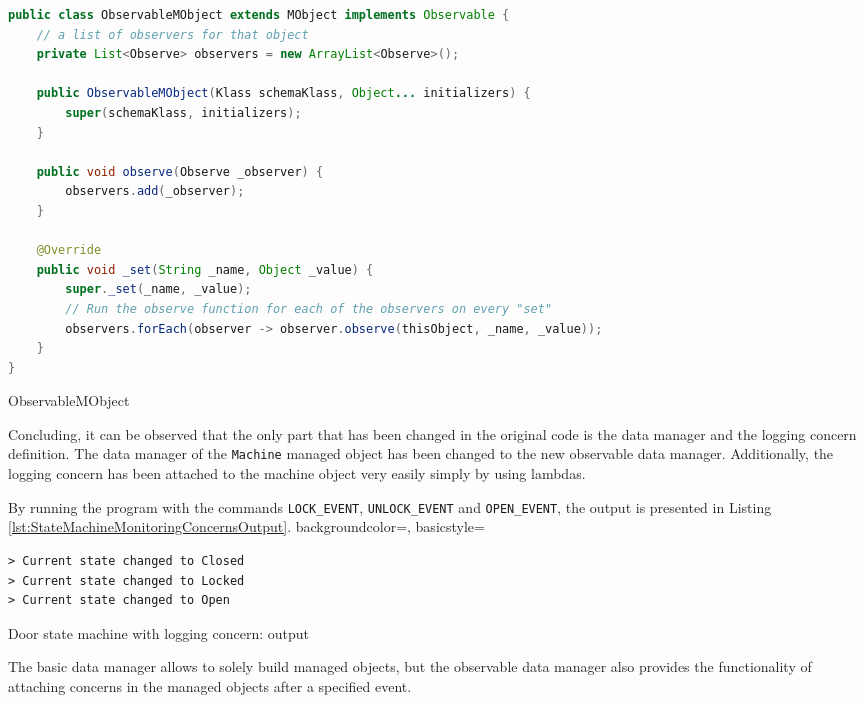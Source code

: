 \begin{sourcecode} [H]
	\begin{lstlisting}[language=Java, escapechar=|]
public class ObservableMObject extends MObject implements Observable {
	// a list of observers for that object
	private List<Observe> observers = new ArrayList<Observe>();

	public ObservableMObject(Klass schemaKlass, Object... initializers) {
		super(schemaKlass, initializers);
	}

	public void observe(Observe _observer) {
		observers.add(_observer);
	}

	@Override
	public void _set(String _name, Object _value) {
		super._set(_name, _value);
		// Run the observe function for each of the observers on every "set"
		observers.forEach(observer -> observer.observe(thisObject, _name, _value));
	}
}
	\end{lstlisting}
	\caption{ObservableMObject}
	\label{lst:ObservableMObject}
\end{sourcecode}

Concluding, it can be observed that the only part that has been changed in the original code is the data manager and the logging concern definition.
The data manager of the \texttt{Machine} managed object has been changed to the new observable data manager.
Additionally, the logging concern has been attached to the machine object very easily simply by using lambdas.

By running the program with the commands \texttt{LOCK\_EVENT}, \texttt{UNLOCK\_EVENT} and \texttt{OPEN\_EVENT}, the output is presented in Listing \ref{lst:StateMachineMonitoringConcernsOutput}.
 {
    backgroundcolor=\color{white},
    basicstyle=\scriptsize\color{black}\ttfamily
}

\begin{sourcecode} [H]
	\lstset{numbers=none}
	\begin{lstlisting}[style=Bash]
> Current state changed to Closed
> Current state changed to Locked
> Current state changed to Open
	\end{lstlisting}
	\caption{Door state machine with logging concern: output}
	\label{lst:StateMachineMonitoringConcernsOutput}
\end{sourcecode}

The basic data manager allows to solely build managed objects, but the observable data manager also provides the functionality of attaching concerns in the managed objects after a specified event.


